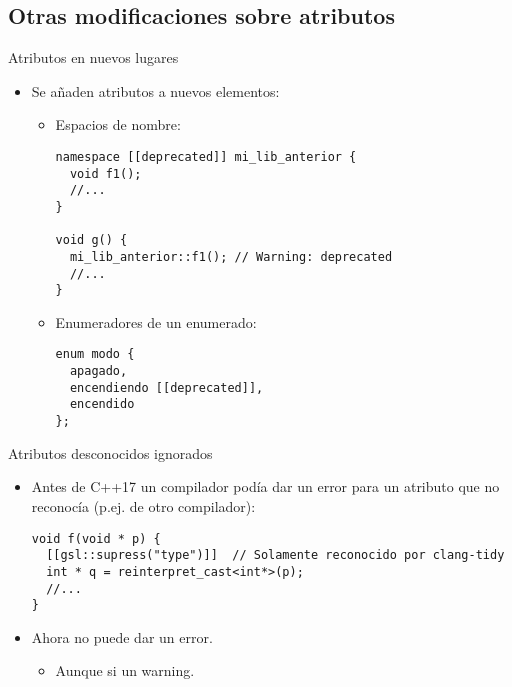 \subsection{Otras modificaciones sobre atributos}

\begin{frame}[t,fragile]{Atributos en nuevos lugares}
\begin{itemize}
  \item Se añaden atributos a nuevos elementos:
    \begin{itemize}
      \item Espacios de nombre:
\begin{lstlisting}
namespace [[deprecated]] mi_lib_anterior {
  void f1();
  //...
}

void g() {
  mi_lib_anterior::f1(); // Warning: deprecated
  //...
}
\end{lstlisting}

      \item Enumeradores de un enumerado:
\begin{lstlisting}
enum modo {
  apagado,
  encendiendo [[deprecated]],
  encendido
};	
\end{lstlisting}
    \end{itemize}
\end{itemize}
\end{frame}

\begin{frame}[t,fragile]{Atributos desconocidos ignorados}
\begin{itemize}
  \item Antes de C++17 un compilador podía dar un error para un atributo
        que no reconocía (p.ej. de otro compilador):
\begin{lstlisting}
void f(void * p) {
  [[gsl::supress("type")]]  // Solamente reconocido por clang-tidy
  int * q = reinterpret_cast<int*>(p);
  //...
}
\end{lstlisting}
  \vfill
  \item Ahora no puede dar un error.
    \begin{itemize}
      \item Aunque si un warning.
    \end{itemize}
\end{itemize}
\end{frame}

